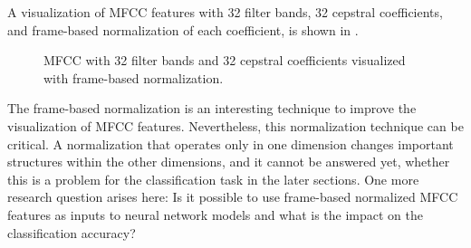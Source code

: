 A visualization of MFCC features with 32 filter bands, 32 cepstral coefficients, and frame-based normalization of each coefficient, is shown in .
\begin{figure}[!ht]
  \centering
  \caption{MFCC with 32 filter bands and 32 cepstral coefficients visualized with frame-based normalization.}
  \label{fig:signal_mfcc_showcase_mfcc32}
\end{figure}
\FloatBarrier
\noindent
The frame-based normalization is an interesting technique to improve the visualization of MFCC features.
Nevertheless, this normalization technique can be critical. 
A normalization that operates only in one dimension changes important structures within the other dimensions, and it cannot be answered yet, whether this is a problem for the classification task in the later sections.
One more research question arises here: Is it possible to use frame-based normalized MFCC features as inputs to neural network models and what is the impact on the classification accuracy?


